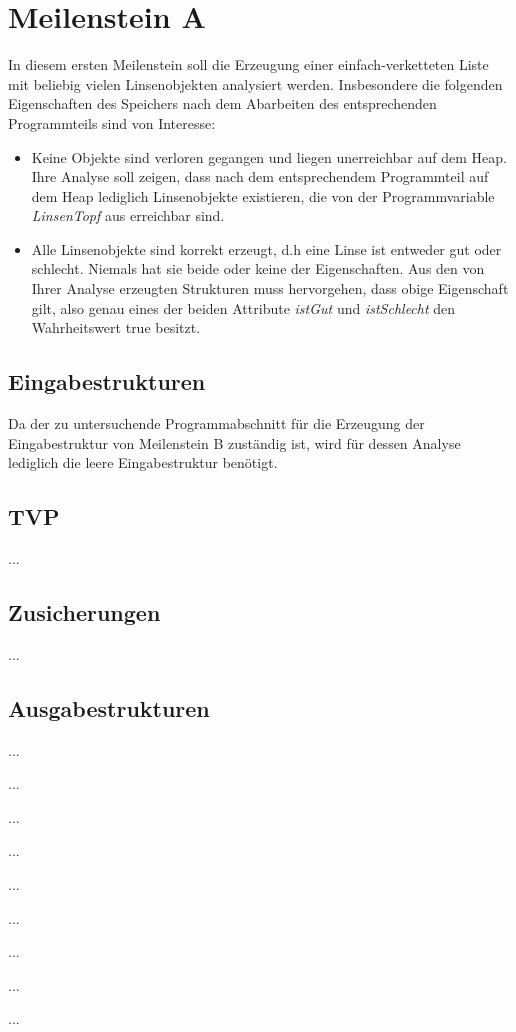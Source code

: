 \section{Meilenstein A}
In diesem ersten Meilenstein soll die Erzeugung einer einfach-verketteten Liste mit beliebig vielen Linsenobjekten analysiert werden. Insbesondere die folgenden Eigenschaften des Speichers nach dem Abarbeiten des entsprechenden Programmteils sind von Interesse:
\begin{itemize}
	\item Keine Objekte sind verloren gegangen und liegen unerreichbar auf dem Heap. Ihre Analyse soll zeigen, dass nach dem entsprechendem Programmteil auf dem Heap lediglich Linsenobjekte existieren, die von der Programmvariable \emph{LinsenTopf} aus erreichbar sind.
	\item Alle Linsenobjekte sind korrekt erzeugt, d.h eine Linse ist entweder gut oder schlecht. Niemals hat sie beide oder keine der Eigenschaften. Aus den von Ihrer Analyse erzeugten Strukturen muss hervorgehen, dass obige Eigenschaft gilt, also genau eines der beiden Attribute \emph{istGut} und \emph{istSchlecht} den Wahrheitswert true besitzt.
\end{itemize}


\subsection{Eingabestrukturen}
Da der zu untersuchende Programmabschnitt für die Erzeugung der Eingabestruktur von Meilenstein B zuständig ist, wird für dessen Analyse lediglich die leere Eingabestruktur benötigt. 


\subsection{TVP}
...


\subsection{Zusicherungen}
...


\subsection{Ausgabestrukturen}
...
\begin{description}
	\item ... 
	\item ... 
	\item ... 
	\item ... 
	\item ... 
	\item ... 
	\item ... 
	\item ... 
\end{description}